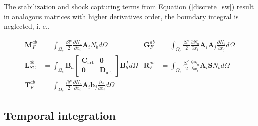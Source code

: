 \documentclass[a4paper,12pt]{elsarticle}
\newcommand{\pder}[2]{\frac{\partial#1}{\partial#2}}
\begin{document}
The stabilization and shock capturing terms from Equation (\ref{discrete_sw}) result in analogous matrices with higher derivatives order, the boundary integral is neglected, i. e.,

\begin{align}
\displaystyle\mathbf{M}_F^{ab} &= \int_{\Omega_e} \frac{\beta l^e}{2} \pder{N_a}{x_i}\mathbf{A}_i N_b d\Omega &
\displaystyle\mathbf{G}_F^{ab} &= \int_{\Omega_e} \frac{\beta l^e}{2} \pder{N_a}{x_i}\mathbf{A}_i\mathbf{A}_j \pder{N_b}{x_j} d\Omega \nonumber\\
\displaystyle\mathbf{L}_{SC}^{ab} &= \int_{\Omega_e} \mathbf{B}_a \left[\begin{matrix}
        \mathbf{C}_\text{art} & \mathbf{0} \\ \mathbf{0} & \mathbf{D}_\text{art}
    \end{matrix}\right] \mathbf{B}_b^T d\Omega &
\displaystyle\mathbf{R}_F^{ab} &= \int_{\Omega_e} \frac{\beta l^e}{2} \pder{N_a}{x_i}\mathbf{A}_i \mathbf{S} N_b d\Omega \\
\displaystyle\mathbf{T}_F^{ab} &= \int_{\Omega_e} \frac{\beta l^e}{2} \pder{N_a}{x_i}\mathbf{A}_i \mathbf{b}_j \pder{z}{x_j} d\Omega
\nonumber
\end{align}


\subsection{Temporal integration}
\end{document}
